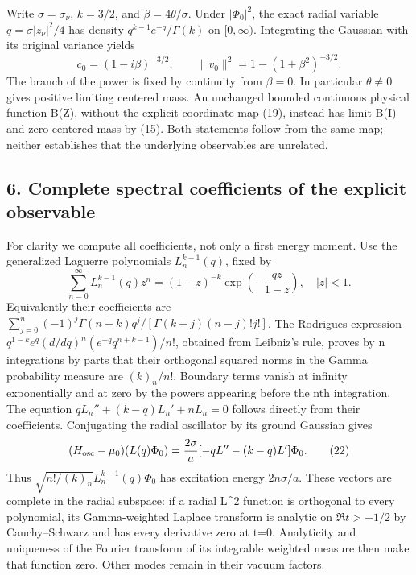 \documentclass[
  11pt,
]{article}
\begin{document}
Write \(\sigma=\sigma_\nu\), \(k=3/2\), and \(\beta=4\theta/\sigma\).
Under \(|\Phi_0|^2\), the exact radial variable \(q=\sigma|z_\nu|^2/4\)
has density \(q^{k-1}e^{-q}/\Gamma(k)\) on \([0,\infty)\). Integrating
the Gaussian with its original variance yields \[
 c_0=(1-i\beta)^{-3/2},\qquad
 \|v_0\|^2=1-(1+\beta^2)^{-3/2}.                          \tag{20}
\] The branch of the power is fixed by continuity from \(\beta=0\). In
particular \(\theta\ne0\) gives positive limiting centered mass. An
unchanged bounded continuous physical function B(Z), without the
explicit coordinate map (19), instead has limit B(I) and zero centered
mass by (15). Both statements follow from the same map; neither
establishes that the underlying observables are unrelated.

\subsection{6. Complete spectral coefficients of the explicit
observable}\label{weak-coupling-part-2-complete-spectral-coefficients-of-the-explicit-observable}

For clarity we compute all coefficients, not only a first energy moment.
Use the generalized Laguerre polynomials \(L_n^{k-1}(q)\), fixed by \[
 \sum_{n=0}^\infty L_n^{k-1}(q)z^n
       =(1-z)^{-k}\exp\left(-\frac{qz}{1-z}\right),\quad |z|<1.
                                                               \tag{21}
\] Equivalently their coefficients are
\(\sum_{j=0}^n(-1)^j\Gamma(n+k)q^j/
[\Gamma(k+j)(n-j)!j!]\). The Rodrigues expression
\(q^{1-k}e^q(d/dq)^n(e^{-q}q^{n+k-1})/n!\), obtained from Leibniz's
rule, proves by n integrations by parts that their orthogonal squared
norms in the Gamma probability measure are \((k)_n/n!\). Boundary terms
vanish at infinity exponentially and at zero by the powers appearing
before the nth integration. The equation \(qL_n''+(k-q)L_n'+nL_n=0\)
follows directly from their coefficients. Conjugating the radial
oscillator by its ground Gaussian gives \[
 (H_{\rm osc}-\mu_0)(L(q)\Phi_0)
     =\frac{2\sigma}{a}[-qL''-(k-q)L']\Phi_0.             \tag{22}
\] Thus \(\sqrt{n!/(k)_n}L_n^{k-1}(q)\Phi_0\) has excitation energy
\(2n\sigma/a\). These vectors are complete in the radial subspace: if a
radial L\^{}2 function is orthogonal to every polynomial, its
Gamma-weighted Laplace transform is analytic on \(\Re t>-1/2\) by
Cauchy--Schwarz and has every derivative zero at t=0. Analyticity and
uniqueness of the Fourier transform of its integrable weighted measure
then make that function zero. Other modes remain in their vacuum
factors.
\end{document}
